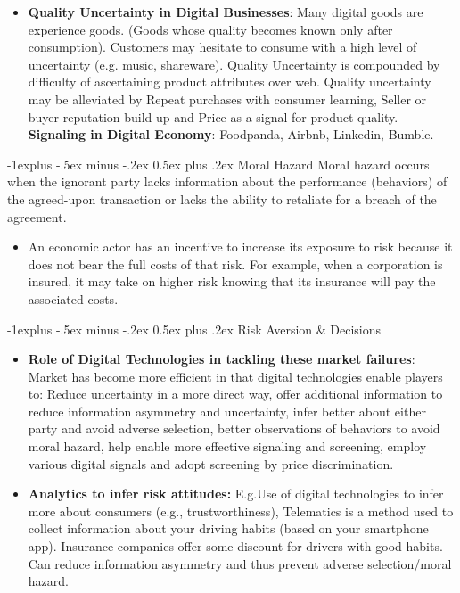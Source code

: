 \documentclass[12pt, landscape]{article}
\makeatletter
\renewcommand{\subsection}{\@startsection{subsection}{2}{0mm}%
                                {-1explus -.5ex minus -.2ex}%
                                {0.5ex plus .2ex}%
                                {\normalfont\normalsize\bfseries}}
\makeatother
\begin{document}
\begin{multicols*}{3}
\begin{itemize}
\item \textbf{Quality Uncertainty in Digital Businesses}: Many digital goods are experience goods. (Goods whose quality becomes known only after consumption). Customers may hesitate to consume with a high level of uncertainty (e.g. music, shareware). Quality Uncertainty is compounded by difficulty of ascertaining product attributes over web. Quality uncertainty may be alleviated by Repeat purchases with consumer learning, Seller or buyer reputation build up and Price as a signal for product quality. \textbf{Signaling in Digital Economy}: Foodpanda, Airbnb, Linkedin, Bumble.
\end{itemize}
\subsection{Moral Hazard}
Moral hazard occurs when the ignorant party lacks information about the performance (behaviors) of the agreed-upon transaction or lacks the ability to retaliate for a breach of the agreement.
\begin{itemize}
\item An economic actor has an incentive to increase its exposure to risk because it does not bear the full costs of that risk. For example, when a corporation is insured, it may take on higher risk knowing that its insurance will pay the associated costs.
\end{itemize}
\subsection{Risk Aversion \& Decisions}
\begin{itemize}
\item \textbf{Role of Digital Technologies in tackling these market failures}: Market has become more efficient in that digital technologies enable players to: Reduce uncertainty in a more direct way, offer additional information to reduce information asymmetry and uncertainty, infer better about either party and avoid adverse selection, better observations of behaviors to avoid moral hazard, help enable more effective signaling and screening, employ various digital signals and adopt screening by price discrimination.
\item \textbf{Analytics to infer risk attitudes:} E.g.Use of digital technologies to infer more about consumers (e.g., trustworthiness), Telematics is a method used to collect information about your driving habits (based on your smartphone app). Insurance companies offer some discount for drivers with good habits. Can reduce information asymmetry and thus prevent adverse selection/moral hazard.
\end{itemize}


\end{multicols*}
\end{document}
